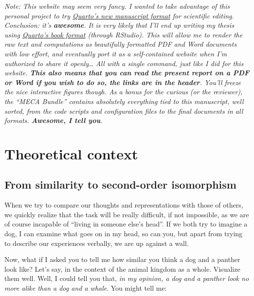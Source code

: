 \documentclass[
  authoryear]{elsarticle}
\begin{document}
\begin{tcolorbox}
\emph{Note: This website may seem very fancy. I wanted to take advantage
of this personal project to try
\href{https://quarto.org/docs/manuscripts/}{Quarto's new manuscript
format} for scientific editing. Conclusion: it's \textbf{awesome}. It is
very likely that I'll end up writing my thesis using
\href{https://quarto.org/docs/books/}{Quarto's book format} (through
RStudio). This will allow me to render the raw text and computations as
beautifully formatted PDF and Word documents with low effort, and
eventually port it as a self-contained website when I'm authorized to
share it openly\ldots{} All with a single command, just like I did for
this website. \textbf{This also means that you can read the present
report on a PDF or Word if you wish to do so, the links are in the
header}. You'll freeze the nice interactive figures though. As a bonus
for the curious (or the reviewer), the ``MECA Bundle'' contains
absolutely everything tied to this manuscript, well sorted, from the
code scripts and configuration files to the final documents in all
formats. \textbf{Awesome, I tell you}.}

\end{tcolorbox}

\newpage

\section{Theoretical context}\label{theoretical-context}

\subsection{From similarity to second-order
isomorphism}\label{from-similarity-to-second-order-isomorphism}

When we try to compare our thoughts and representations with those of
others, we quickly realize that the task will be really difficult, if
not impossible, as we are of course incapable of ``living in someone
else's head''. If we both try to imagine a dog, I can examine what goes
on in my head, so can you, but apart from trying to describe our
experiences verbally, we are up against a wall.

Now, what if I asked you to tell me how similar you think a dog and a
panther look like? Let's say, in the context of the animal kingdom as a
whole. Visualize them well. Well, I could tell you that, \emph{in my
opinion, a dog and a panther look no more alike than a dog and a whale}.
You might tell me: {}
\end{document}
